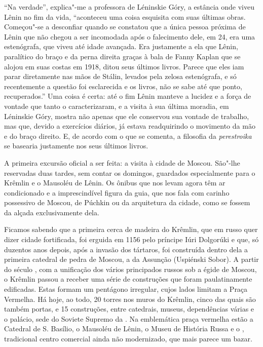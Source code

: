 ``Na verdade'', explica"-me a professora de Léninskie Góry, a estância onde viveu Lênin no fim da vida, ``aconteceu uma coisa esquisita com suas últimas obras. Começou"-se a desconfiar quando se constatou que a única pessoa próxima de Lênin que não chegou a ser incomodada após o falecimento dele, em 24, era uma estenógrafa, que viveu até idade avançada. Era justamente a ela que Lênin, paralítico do braço e da perna direita graças à bala de Fanny Kaplan que se alojou em suas costas em 1918, ditou seus últimos livros. Parece que eles iam parar diretamente nas mãos de Stálin, levados pela zelosa estenógrafa, e só recentemente a questão foi esclarecida e os livros, não se sabe até que ponto, recuperados.'' Uma coisa é certa: até o fim Lênin manteve a lucidez e a força de vontade que tanto o caracterizaram, e a visita à sua última moradia, em Léninskie Góry, mostra não apenas que ele conservou sua vontade de trabalho, mas que, devido a exercícios diários, já estava readquirindo o movimento da mão e do braço direito. E, de acordo com o que se comenta, a filosofia da \emph{perestroika} se basearia justamente nos seus últimos livros.

A primeira excursão oficial a ser feita: a visita à cidade de Moscou. São"-lhe reservadas duas tardes, sem contar os domingos, guardados especialmente para o Krêmlin e o Mausoléu de Lênin. Os ônibus que nos levam agora têm ar condicionado e a imprescindível figura da guia, que nos fala com carinho possessivo de Moscou, de Púchkin ou da arquitetura da cidade, como se fossem da alçada exclusivamente dela.

Ficamos sabendo que a primeira cerca de madeira do Krêmlin, que em russo quer dizer cidade fortificada, foi erguida em 1156 pelo príncipe Iúri Dolgorúki e que, só duzentos anos depois, após a invasão dos tártaros, foi construída dentro dela a primeira catedral de pedra de Moscou, a da Assunção (Uspiénski Sobor). A partir do século , com a unificação dos vários principados russos sob a égide de Moscou, o Krêmlin passou a receber uma série de construções que foram paulatinamente edificadas. Estas formam um pentágono irregular, cujos lados limitam a Praça Vermelha. Há hoje, ao todo, 20 torres nos muros do Krêmlin, cinco das quais são também portas, e 15 construções, entre catedrais, museus, dependências várias e o palácio, sede do Soviete Supremo da . Na emblemática praça vermelha estão a Catedral de S. Basílio, o Mausoléu de Lênin, o Museu de História Russa e o , tradicional centro comercial ainda não modernizado, que mais parece um bazar.

